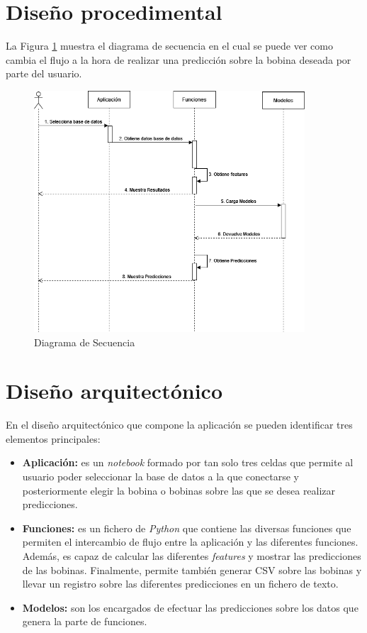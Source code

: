 \section{Diseño procedimental}
La Figura \ref{f:secu} muestra el diagrama de secuencia en el cual se puede ver como cambia el flujo a la hora de realizar una predicción sobre la bobina deseada por parte del usuario.

\begin{figure}[h]
 \centering
  \includegraphics[width=0.9\textwidth]{img/secu.png}
 \caption{Diagrama de Secuencia}
 \label{f:secu}
\end{figure}

\section{Diseño arquitectónico}
En el diseño arquitectónico que compone la aplicación se pueden identificar tres elementos principales:
\begin{itemize}
    \item \textbf{Aplicación:} es un \emph{notebook} formado por tan solo tres celdas que permite al usuario poder seleccionar la base de datos a la que conectarse y posteriormente elegir la bobina o bobinas sobre las que se desea realizar predicciones.
    \item \textbf{Funciones:} es un fichero de \emph{Python} que contiene las diversas funciones que permiten el intercambio de flujo entre la aplicación y las diferentes funciones. Además, es capaz de calcular las diferentes \emph{features} y mostrar las predicciones de las bobinas. Finalmente, permite también generar CSV sobre las bobinas y llevar un registro sobre las diferentes predicciones en un fichero de texto.
    \item \textbf{Modelos:} son los encargados de efectuar las predicciones sobre los datos que genera la parte de funciones.
\end{itemize}

